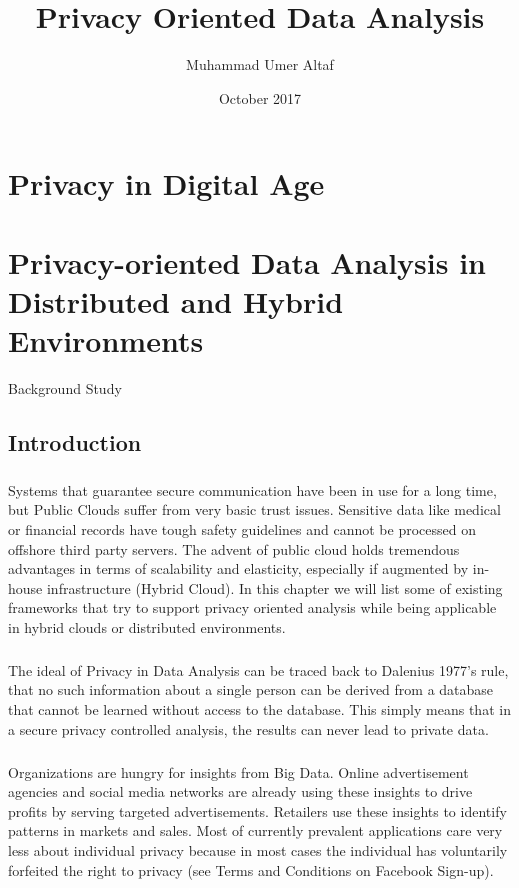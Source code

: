 \documentclass{report}
\title{Privacy Oriented Data Analysis}
\author{Muhammad Umer Altaf }
\date{October 2017}
\begin{document}
\maketitle
\tableofcontents

\chapter{Privacy in Digital Age}






\chapter{Privacy-oriented Data Analysis in Distributed and Hybrid Environments}{Background Study}
\section{Introduction}
\paragraph{}
Systems that guarantee secure communication have been in use for a long time, but Public Clouds suffer from very basic trust issues. Sensitive data like medical or financial records have tough safety guidelines and cannot be processed on offshore third party servers. The advent of public cloud holds tremendous advantages in terms of scalability and elasticity, especially if augmented by in-house infrastructure (Hybrid Cloud). In this chapter we will list some of existing frameworks that try to support privacy oriented analysis while being applicable in hybrid clouds or distributed environments.
\paragraph{}
The ideal of Privacy in Data Analysis can be traced back to Dalenius 1977’s \cite{dalenius1977} rule, that no such information about a single person can be derived from a database that cannot be learned without access to the database. This simply means that in a secure privacy controlled analysis, the results can never lead to private data.
\paragraph{}
Organizations are hungry for insights from Big Data. Online advertisement agencies and social media networks are already using these insights to drive profits by serving targeted advertisements. Retailers use these insights to identify patterns in markets and sales. Most of currently prevalent applications care very less about individual privacy because in most cases the individual has voluntarily forfeited the right to privacy (see Terms and Conditions on Facebook Sign-up).
\end{document}
